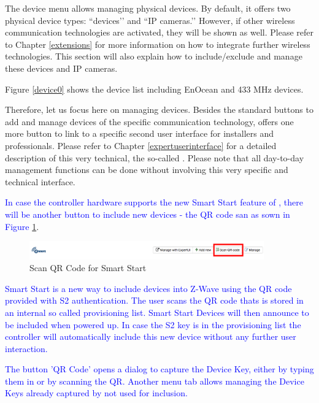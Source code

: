 The device menu allows managing physical devices. By default, it offers two physical 
device types: ``\zwave devices’’ and ``IP cameras.’’ However, if other wireless communication 
technologies are activated, they will be shown as well. Please refer to 
Chapter \ref{extensions} for more information on how to integrate further 
wireless technologies.   This section will also explain how to include/exclude and manage 
these devices and IP cameras.

Figure \ref{device0} shows the device list including EnOcean and 433 MHz devices.

Therefore, let us focus here on managing \zwave devices. Besides the standard buttons 
to add and manage devices of the specific communication technology, \zwave offers one
 more button to link to a specific second \zwave user interface for installers and professionals.
Please refer to Chapter \ref{expertuserinterface} for a detailed description of this very 
technical, the so-called \zweui. Please note that all day-to-day management functions 
can be done without involving this very specific and technical interface.

\textcolor{blue}{In case the controller hardware supports the new Smart Start feature of 
\zwave, there will be 
another button to include new devices - the QR code san as sown in Figure} \ref{shui-ss1}.

\begin{figure}
\begin{center}
\includegraphics[width=0.9\textwidth]{pngs/cap4/shui-ss1.png}
\caption{Scan QR Code for Smart Start}
\label{shui-ss1}
\end{center}
\end{figure}

\textcolor{blue}{Smart Start is a new way to include devices into Z-Wave using the QR code 
provided with S2 authentication.  The user scans the QR code thats is stored in an internal 
so called  provisioning list. Smart Start Devices will then announce to be included when 
powered up. In case the S2 key is in the provisioning list the controller will automatically 
include  this new device without any further user interaction.}

\textcolor{blue}{The button 'QR Code' opens a dialog to capture the Device Key, either by 
typing them in or by scanning the QR. Another menu tab allows managing the Device Keys 
already captured by not used for inclusion.}

